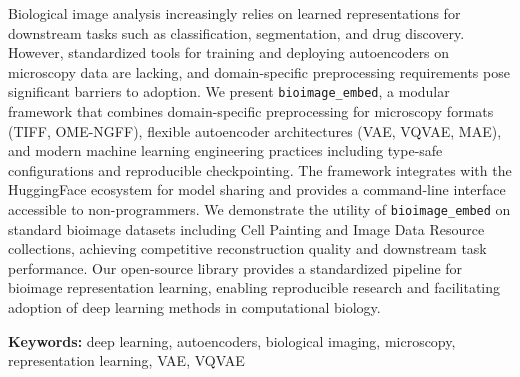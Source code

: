 Biological image analysis increasingly relies on learned representations for downstream tasks such as classification, segmentation, and drug discovery. However, standardized tools for training and deploying autoencoders on microscopy data are lacking, and domain-specific preprocessing requirements pose significant barriers to adoption. We present \texttt{bioimage\_embed}, a modular framework that combines domain-specific preprocessing for microscopy formats (TIFF, OME-NGFF), flexible autoencoder architectures (VAE, VQVAE, MAE), and modern machine learning engineering practices including type-safe configurations and reproducible checkpointing. The framework integrates with the HuggingFace ecosystem for model sharing and provides a command-line interface accessible to non-programmers. We demonstrate the utility of \texttt{bioimage\_embed} on standard bioimage datasets including Cell Painting and Image Data Resource collections, achieving competitive reconstruction quality and downstream task performance. Our open-source library provides a standardized pipeline for bioimage representation learning, enabling reproducible research and facilitating adoption of deep learning methods in computational biology.

\textbf{Keywords:} deep learning, autoencoders, biological imaging, microscopy, representation learning, VAE, VQVAE
